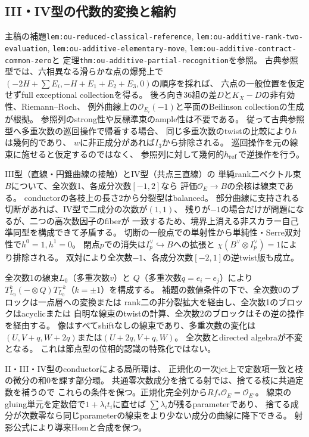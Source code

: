 \documentclass[11pt,a4paper]{ltjsarticle}
\begin{document}
\subsection*{III・IV型の代数的変換と縮約}
主稿の補題\texttt{lem:ou-reduced-classical-reference},
\texttt{lem:ou-additive-rank-two-evaluation},
\texttt{lem:ou-additive-elementary-move},
\texttt{lem:ou-additive-contract-common-zero}と
定理\texttt{thm:ou-additive-partial-recognition}を参照。
古典参照型では、六相異なる滑らかな点の爆発上で
$(-2H+\sum E_i,-H+E_1+E_2+E_3,0)$の順序を採れば、
六点の一般位置を仮定せずfull exceptional collectionを得る。
後ろ向き36組の差$D$と$K_X-D$の非有効性、Riemann--Roch、
例外曲線上の$\mathcal O_{E_i}(-1)$と平面のBeilinson collectionの生成が根拠。
参照列のstrong性や反標準束のample性は不要である。
従って古典参照型へ多重次数の巡回操作で帰着する場合、
同じ多重次数のtwistの比較により$h$は幾何的であり、
$w$に非正成分があれば$I_3$から排除される。
巡回操作を元の線束に施せると仮定するのではなく、
参照列に対して幾何的$h_{\rm ref}$で逆操作を行う。

III型（直線・円錐曲線の接触）とIV型（共点三直線）の
単純rank二ベクトル束$B$について、全次数1、各成分次数$[-1,2]$なら
評価$\mathcal O_E\to B$の余核は線束である。
conductorの各枝上の長さ2から分裂型はbalanced。
部分曲線に支持される切断があれば、IV型で二成分の次数が$(1,1)$、
残りが$-1$の場合だけが問題になるが、二つの高次数因子のfiberが
一致するため、境界上消える非スカラー自己準同型を構成できて矛盾する。
切断の一般点での単射性から単純性・Serre双対性で$h^0=1,h^1=0$。
閉点$p$での消失は$I_p^\vee\hookrightarrow B$への拡張と
$\chi(B^\vee\otimes I_p^\vee)=1$により排除される。
双対により全次数$-1$、各成分次数$[-2,1]$の逆twist版も成立。

全次数1の線束$L_0$（多重次数$v$）と
$Q$（多重次数$q=e_i-e_j$）により
$T_{L_0}^{k}(-\otimes Q)T_{L_0}^{-k}$（$k=\pm1$）を構成する。
補題の数値条件の下で、全次数0のブロックは一点層への変換または
rank二の非分裂拡大を経由し、全次数1のブロックはacyclicまたは
自明な線束のtwistの計算、全次数2のブロックはその逆の操作を経由する。
像はすべてshiftなしの線束であり、多重次数の変化は
$(U,V+q,W+2q)$または$(U+2q,V+q,W)$。
全次数とdirected algebraが不変となる。
これは節点型の位相的認識の特殊化ではない。

II・III・IV型のconductorによる局所環は、
正規化の一次jet上で定数項一致と枝の微分の和0を課す部分環。
共通零次数成分を捨てる射では、捨てる枝に共通定数を補うので
これらの条件を保つ。正規化完全列から$Rf_*\mathcal O_E=\mathcal O_{E'}$。
線束のgluing単元を定数倍で$1+\lambda_i t_i$に直せば
$\sum\lambda_i$が残るparameterであり、
捨てる成分が次数零なら同じparameterの線束をより少ない成分の曲線に降下できる。
射影公式により導来Homと合成を保つ。
\end{document}
